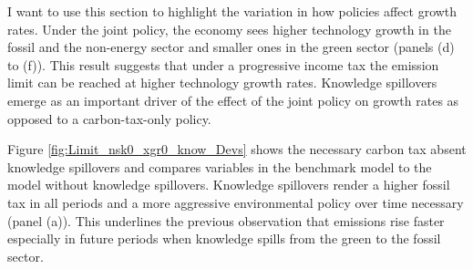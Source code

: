 I want to use this section to highlight the variation in how policies affect growth rates.
Under the joint policy, the economy sees higher technology growth in the fossil and the non-energy sector and smaller ones in the green sector (panels (d) to (f)). 
This result suggests that under a progressive income tax the emission limit can be reached at higher technology growth rates.
Knowledge spillovers emerge as an important driver of the effect of the joint policy on growth rates as opposed to a carbon-tax-only policy. 

Figure \ref{fig:Limit_nsk0_xgr0_know_Devs} shows the necessary carbon tax absent knowledge spillovers and compares variables in the benchmark model to the model without knowledge spillovers. 
Knowledge spillovers render a higher fossil tax in all periods and a more aggressive environmental policy over time necessary (panel (a)).
This underlines the previous observation that emissions rise faster especially in future periods when knowledge spills from the green to the fossil sector. 

